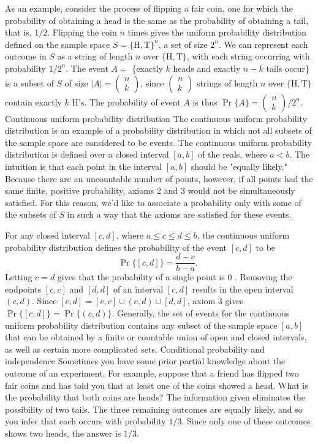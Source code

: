 \documentclass[lang=cn,newtx,10pt,scheme=chinese]{elegantbook}
\begin{document}
As an example, consider the process of flipping a fair coin, one for which the probability of obtaining a head is the same as the probability of obtaining a tail, that is, $1 / 2$. Flipping the coin $n$ times gives the uniform probability distribution defined on the sample space $S=\{\mathrm{H}, \mathrm{T}\}^n$, a set of size $2^n$. We can represent each outcome in $S$ as a string of length $n$ over $\{\mathrm{H}, \mathrm{T}\}$, with each string occurring with probability $1 / 2^n$. The event $A=$ \{exactly $k$ heads and exactly $n-k$ tails occur\} is a subset of $S$ of size $|A|=\left(\begin{array}{l}n \\ k\end{array}\right)$, since $\left(\begin{array}{l}n \\ k\end{array}\right)$ strings of length $n$ over $\{\mathrm{H}, \mathrm{T}\}$ contain exactly $k$ H's. The probability of event $A$ is thus $\operatorname{Pr}\{A\}=\left(\begin{array}{l}n \\ k\end{array}\right) / 2^n$.
Continuous uniform probability distribution
The continuous uniform probability distribution is an example of a probability distribution in which not all subsets of the sample space are considered to be events. The continuous uniform probability distribution is defined over a closed interval $[a, b]$ of the reals, where $a<b$. The intuition is that each point in the interval $[a, b]$ should be "equally likely." Because there are an uncountable number of points, however, if all points had the same finite, positive probability, axioms 2 and 3 would not be simultaneously satisfied. For this reason, we'd like to associate a probability only with some of the subsets of $S$ in such a way that the axioms are satisfied for these events.

For any closed interval $[c, d]$, where $a \leq c \leq d \leq b$, the continuous uniform probability distribution defines the probability of the event $[c, d]$ to be
$$
\operatorname{Pr}\{[c, d]\}=\frac{d-c}{b-a} \text {. }
$$
Letting $c=d$ gives that the probability of a single point is 0 . Removing the endpoints $[c, c]$ and $[d, d]$ of an interval $[c, d]$ results in the open interval $(c, d)$. Since $[c, d]=[c, c] \cup(c, d) \cup[d, d]$, axiom 3 gives $\operatorname{Pr}\{[c, d]\}=\operatorname{Pr}\{(c, d)\}$. Generally, the set of events for the continuous uniform probability distribution contains any subset of the sample space $[a, b]$ that can be obtained by a finite or countable union of open and closed intervals, as well as certain more complicated sets.
Conditional probability and independence
Sometimes you have some prior partial knowledge about the outcome of an experiment. For example, suppose that a friend has flipped two fair coins and has told you that at least one of the coins showed a head. What is the probability that both coins are heads? The information given eliminates the possibility of two tails. The three remaining outcomes are equally likely, and so you infer that each occurs with probability $1 / 3$. Since only one of these outcomes shows two heads, the answer is $1 / 3$.
\end{document}
